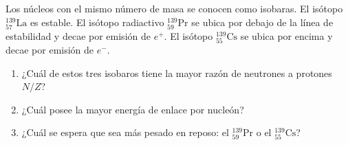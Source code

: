 \item Los núcleos con el mismo número de masa se conocen como isobaras. El isótopo $^{139}_{57}\text{La}$ es estable. El isótopo radiactivo $^{139}_{59}\text{Pr}$ se ubica por debajo de la línea de estabilidad y decae por emisión de $e^+$. El isótopo $^{139}_{55}\text{Cs}$ se ubica por encima y decae por emisión de $e^-$.
\begin{enumerate}
    \item ¿Cuál de estos tres isobaros tiene la mayor razón de neutrones a protones $N/Z$?
    \item ¿Cuál posee la mayor energía de enlace por nucleón?
    \item ¿Cuál se espera que sea más pesado en reposo: el $^{139}_{59}\text{Pr}$ o el $^{139}_{55}\text{Cs}$?
\end{enumerate}